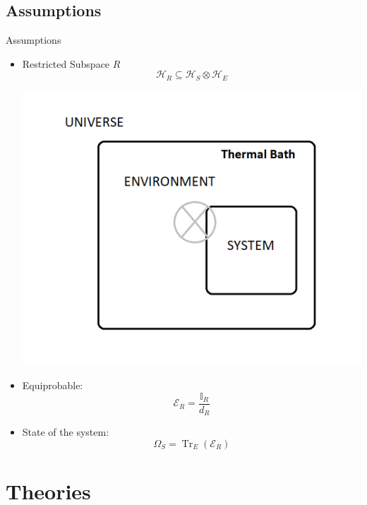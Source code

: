 \documentclass[handout]{beamer}
\begin{document}
\subsection{Assumptions}
\begin{frame}{Assumptions}
\begin{itemize}
\item Restricted Subspace $R$
\begin{equation}\mathcal{H}_{R} \subseteq \mathcal{H}_{S} \otimes \mathcal{H}_{E}
\end{equation}
\begin{center}
\includegraphics[scale=0.4]{figures/photo}
\end{center}

\item Equiprobable:
\begin{equation}
\mathcal{E}_{R}=\frac{\mathbb{I}_{R}}{d_{R}}
\label{equiprob}
\end{equation}
\item State of the system:
\begin{equation}\Omega_{S}=\operatorname{Tr}_{E}\left(\mathcal{E}_{R}\right)
\end{equation}
\end{itemize}
\end{frame}

\section{Theories}
\end{document}
